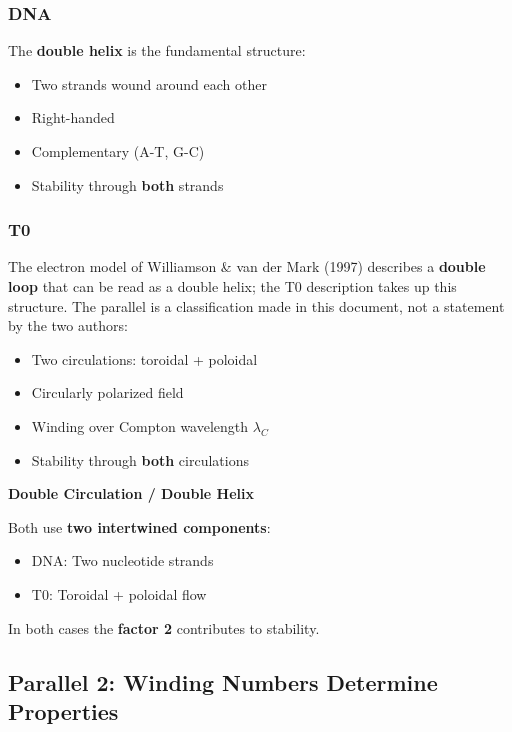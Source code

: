 	\subsubsection{DNA}

	The \textbf{double helix} is the fundamental structure:
	\begin{itemize}
		\item Two strands wound around each other
		\item Right-handed
		\item Complementary (A-T, G-C)
		\item Stability through \textbf{both} strands
	\end{itemize}

	\subsubsection{T0}

	The electron model of Williamson \& van der Mark (1997) describes a \textbf{double loop} that can be read as a double helix; the T0 description takes up this structure. The parallel is a classification made in this document, not a statement by the two authors:
	\begin{itemize}
		\item Two circulations: toroidal + poloidal
		\item Circularly polarized field
		\item Winding over Compton wavelength $\lambda_C$
		\item Stability through \textbf{both} circulations
	\end{itemize}

	\begin{keyresult}
		\textbf{Double Circulation / Double Helix}

		Both use \textbf{two intertwined components}:
		\begin{itemize}
			\item DNA: Two nucleotide strands
			\item T0: Toroidal + poloidal flow
		\end{itemize}

		In both cases the \textbf{factor 2} contributes to stability.
	\end{keyresult}

	\subsection{Parallel 2: Winding Numbers Determine Properties}

